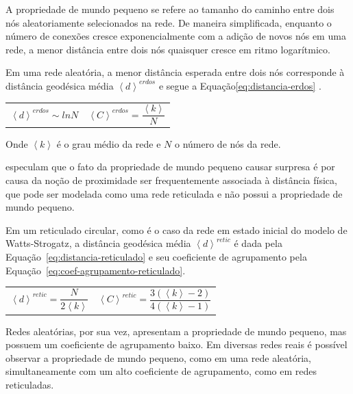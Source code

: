 \documentclass[12pt,a4paper,final]{article}
\newcommand{\avg}[1]{\left\langle #1 \right\rangle} %
\begin{document}
A propriedade de mundo pequeno se refere ao tamanho do caminho entre dois nós aleatoriamente selecionados na rede. De maneira simplificada, enquanto o número de conexões cresce exponencialmente com a adição de novos nós em uma rede, a menor distância entre dois nós quaisquer cresce em ritmo logarítmico. 

Em uma rede aleatória, a menor distância esperada entre dois nós corresponde à distância geodésica média $\avg{d}^\textit{erdos}$ e segue a Equação\ref{eq:distancia-erdos} \cite{Barabasi2016-rn}.

\noindent
\begin{tabularx}{\linewidth}{@{}XX@{}}
    \begin{equation} \label{eq:distancia-erdos}
        \avg{d}^\textit{erdos} \sim ln N
    \end{equation} &
    \begin{equation} \label{eq:coef-agrupamento-erdos}
        \avg{C}^\textit{erdos} = \frac{\avg{k}}{N}
    \end{equation}
\end{tabularx}

Onde $\avg{k}$ é o grau médio da rede e $N$ o número de nós da rede.

 especulam que o fato da propriedade de mundo pequeno causar surpresa é por causa da noção de proximidade ser frequentemente associada à distância física, que pode ser modelada como uma rede reticulada e não possui a propriedade de mundo pequeno.

Em um reticulado circular, como é o caso da rede em estado inicial do modelo de Watts-Strogatz, a distância geodésica média $\avg{d}^ \textit{retic}$ é dada pela Equação~\ref{eq:distancia-reticulado} e seu coeficiente de agrupamento pela Equação~\ref{eq:coef-agrupamento-reticulado}.

\noindent
\begin{tabularx}{\linewidth}{@{}XX@{}}
    \begin{equation} \label{eq:distancia-reticulado}
        \avg{d}^\textit{retic} = \frac{N}{2\avg{k}}
    \end{equation} &
    \begin{equation} \label{eq:coef-agrupamento-reticulado}
        \avg{C}^\textit{retic} = \frac{3(\avg{k} - 2)}{4 (\avg{k} -1 )}
    \end{equation}
\end{tabularx}

Redes aleatórias, por sua vez, apresentam a propriedade de mundo pequeno, mas possuem um coeficiente de agrupamento baixo. Em diversas redes reais é possível observar a propriedade de mundo pequeno, como em uma rede aleatória, simultaneamente com um alto coeficiente de agrupamento, como em redes reticuladas.
\end{document}
